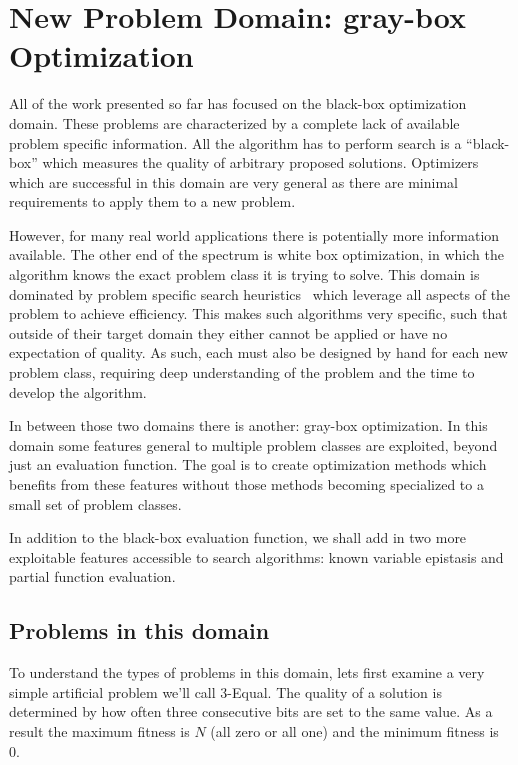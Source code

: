 \chapter{New Problem Domain: gray-box Optimization}
\label{chap-graybox}
All of the work presented so far has focused on the black-box optimization
domain. These problems are characterized by a complete lack of available
problem specific information. All the algorithm has to perform search
is a ``black-box'' which measures the quality of arbitrary proposed
solutions. Optimizers which are successful in this domain are very general
as there are minimal requirements to apply them to a new problem.

However, for many real world applications there is potentially more information
available. The other end of the spectrum is white box optimization, in which
the algorithm knows the exact problem class it is trying to solve. This domain
is dominated by problem specific search
heuristics~\cite{een:2004:satsolver,sherrington:1975:isingsolver,wright:2000:solvingnk} which
leverage all aspects of the problem to achieve efficiency. This makes such
algorithms very specific, such that outside of their target domain they
either cannot be applied or have no expectation of quality. As such,
each must also be designed by hand for each new problem class, requiring
deep understanding of the problem and the time to develop the algorithm.

In between those two domains there is another: gray-box optimization. In this
domain some features general to multiple problem classes are exploited, beyond
just an evaluation function. The goal is to create optimization methods which
benefits from these features without those methods becoming specialized to
a small set of problem classes.

In addition to the black-box evaluation function, we shall
add in two more exploitable features accessible to search algorithms:
known variable epistasis and partial function evaluation.

\section{Problems in this domain}
To understand the types of problems in this domain, lets first examine
a very simple artificial problem we'll call 3-Equal. The quality
of a solution is determined by how often three consecutive bits are set
to the same value. As a result the maximum fitness is $N$ (all zero or all one) and the minimum fitness
is 0.

